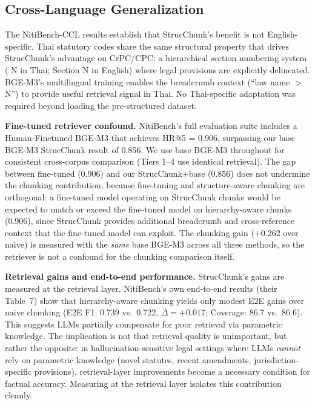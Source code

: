 \documentclass[sn-mathphys,Numbered]{sn-jnl}%
\begin{document}
\subsection{Cross-Language Generalization}

The NitiBench-CCL results establish that StrucChunk's benefit is not
English-specific.  Thai statutory codes share the same structural property
that drives StrucChunk's advantage on CrPC/CPC: a hierarchical section
numbering system ( N in Thai; Section N in English)
where legal provisions are explicitly delineated.  BGE-M3's multilingual
training enables the breadcrumb context (``law name $>$
 N'') to provide useful retrieval signal in Thai.
No Thai-specific adaptation was required beyond loading the pre-structured
dataset.

\textbf{Fine-tuned retriever confound.}  NitiBench's full evaluation suite
includes a Human-Finetuned BGE-M3 that achieves HR@5 = 0.906, surpassing
our base BGE-M3 StrucChunk result of 0.856.  We use base BGE-M3 throughout
for consistent cross-corpus comparison (Tiers 1--4 use identical
retrieval).  The gap between fine-tuned (0.906) and our StrucChunk+base
(0.856) does not undermine the chunking contribution, because fine-tuning
and structure-aware chunking are orthogonal: a fine-tuned model operating on
StrucChunk chunks would be expected to match or exceed the fine-tuned model
on hierarchy-aware chunks (0.906), since StrucChunk provides additional
breadcrumb and cross-reference context that the fine-tuned model can exploit.
The chunking gain (+0.262 over naive) is measured with the \emph{same} base
BGE-M3 across all three methods, so the retriever is not a confound for the
chunking comparison itself.

\textbf{Retrieval gains and end-to-end performance.}  StrucChunk's gains
are measured at the retrieval layer.  NitiBench's own end-to-end results
(their Table~7) show that hierarchy-aware chunking yields only modest E2E
gains over naive chunking (E2E F1: 0.739 vs.\ 0.722, $\Delta = +0.017$;
Coverage: 86.7 vs.\ 86.6).  This suggests LLMs partially compensate for
poor retrieval via parametric knowledge.  The implication is not that
retrieval quality is unimportant, but rather the opposite: in
hallucination-sensitive legal settings where LLMs \emph{cannot} rely on
parametric knowledge (novel statutes, recent amendments, jurisdiction-specific
provisions), retrieval-layer improvements become a necessary condition for
factual accuracy.  Measuring at the retrieval layer isolates this
contribution cleanly.
\end{document}
